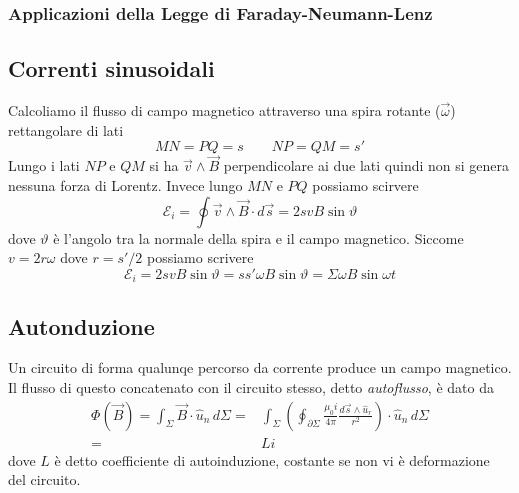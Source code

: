 \documentclass[x11names]{report}
\begin{document}


\subsubsection{Applicazioni della Legge di Faraday-Neumann-Lenz}

\subsection{Correnti sinusoidali}
Calcoliamo il flusso di campo magnetico attraverso una spira rotante (\(\vec
\omega\)) rettangolare di lati 
\[
MN = PQ = s \qquad NP = QM = s'
\]
Lungo i lati \(NP\) e \(QM\) si ha \(\vec{v}\wedge\vec{B}\) perpendicolare ai due lati quindi non si genera nessuna forza di Lorentz. Invece lungo \(MN\) e \(PQ\) possiamo scirvere
\[
\mathcal{E}_i = \oint \vec{v}\wedge\vec{B} \cdot d\vec{s} = 2svB\sin\vartheta
\]
dove \(\vartheta\) è l'angolo tra la normale della spira e il campo magnetico. Siccome \(v=2r\omega\) dove \(r = s'/2\) possiamo scrivere
\[
\mathcal{E}_i = 2svB\sin\vartheta = ss'\omega B\sin\vartheta = \Sigma \omega B\sin\omega t
\]

\subsection{Autonduzione}
Un circuito di forma qualunqe percorso da corrente produce un campo magnetico. Il flusso di questo concatenato con il circuito stesso, detto \textit{autoflusso}, è dato da 
\begin{align*}
	\Phi(\vec{B}) = \int_\Sigma \vec{B}\cdot \hat{u}_n \, d\Sigma =& \int_\Sigma \left(\oint_{\partial\Sigma} \frac{\mu_0 i}{4\pi}\frac{d\vec{s}\wedge\hat{u}_r}{r^2}\right) \cdot \hat{u}_n \, d\Sigma \\
	=& Li
\end{align*}
dove \(L\) è detto coefficiente di autoinduzione, costante se non vi è deformazione del circuito. 
\end{document}
